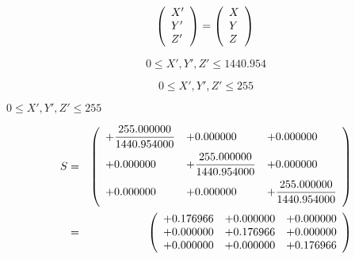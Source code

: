 \documentclass{article}
\begin{document}
\[ \left( \begin{array}{l} X' \\ Y' \\ Z' \\ \end{array} \right) = \left( \begin{array}{l} X \\ Y \\ Z \\ \end{array} \right) \\ \]
\pagebreak

\[ 0 \le X', Y', Z' \le 1440.954 \]
\pagebreak

\[ 0 \le X', Y', Z' \le 255 \]
\pagebreak

$ 0 \le X', Y', Z' \le 255 $
\pagebreak

\begin{eqnarray*} S &=& \left( \begin{array}{lll} +\dfrac{255.000000}{1440.954000} & +0.000000 & +0.000000 \vspace{.5em} \\ +0.000000 & +\dfrac{255.000000}{1440.954000} & +0.000000 \vspace{.5em} \\ +0.000000 & +0.000000 & +\dfrac{255.000000}{1440.954000} \vspace{.5em} \\ \end{array} \right) \\ &=& \left( \begin{array}{lll} +0.176966 & +0.000000 & +0.000000 \\ +0.000000 & +0.176966 & +0.000000 \\ +0.000000 & +0.000000 & +0.176966 \\ \end{array} \right) \end{eqnarray*}
\pagebreak
\end{document}
